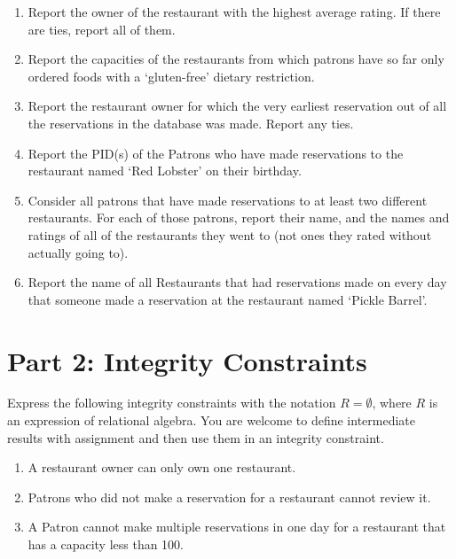 \documentclass{article}
\begin{document}
\begin{enumerate}
\item   %
Report the owner of the restaurant with the highest average rating. If there are ties, report all of them.

\item   %
Report the capacities of the restaurants from which patrons have so far only ordered foods with a `gluten-free' dietary restriction.

\item   %
Report the restaurant owner for which the very earliest reservation out of all the reservations in the database was made.  Report any ties.

\item   %
Report the PID(s) of the Patrons who have made reservations to the restaurant named `Red Lobster' on their birthday.

\item   %
Consider all patrons that have made reservations to at least two different restaurants. For each of those patrons, report their name, and the names and ratings of all of the restaurants they went to (not ones they rated without actually going to).

\item   %
Report the name of all Restaurants that had reservations made on every day that someone made a reservation at the restaurant named `Pickle Barrel'.

\end{enumerate}



\section*{Part 2: Integrity Constraints}


Express the following integrity constraints
with the notation $R = \emptyset$, where $R$ is an expression of relational algebra. 
You are welcome to define intermediate results with assignment
and then use them in an integrity constraint.

\begin{enumerate}

\item   %
A restaurant owner can only own one restaurant.

\item %
Patrons who did not make a reservation for a restaurant cannot review it.

\item %
A Patron cannot make multiple reservations in one day for a restaurant that has a capacity less than 100.

\end{enumerate}
\end{document}
